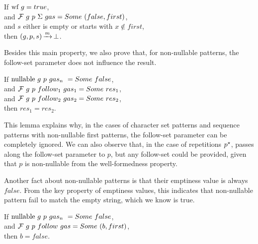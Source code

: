 \begin{lemma}
If $\text{wf}\ g = true$, \\
and $\mathcal{F}{}\ g\ p\ \Sigma\ gas = Some\ (false, first)$, \\
and $s$ either is empty or starts with $x \notin first$, \\
then $(g,p,s) \operatorname{\xrightarrow{\mathit{m}}} \operatorname{\bot}$.
\end{lemma}

Besides this main property,
we also prove that, for non-nullable patterns,
the follow-set parameter does not influence the result.

\begin{lemma}
If $\text{nullable}\ g\ p\ gas_n\ = Some\ false$, \\
and $\mathcal{F}{}\ g\ p\ follow_1\ gas_1 = Some\ res_1$, \\
and $\mathcal{F}{}\ g\ p\ follow_2\ gas_2 = Some\ res_2$, \\
then $res_1 = res_2$.
\end{lemma}

This lemma explains why, in the cases of character set patterns
and sequence patterns with non-nullable first patterns,
the follow-set parameter can be completely ignored.
We can also observe that, in the case of repetitions $p^\star$,
\lpeg{} passes along the follow-set parameter to $p$,
but any follow-set could be provided,
given that $p$ is non-nullable from the well-formedness property.

Another fact about non-nullable patterns
is that their emptiness value is always $false$.
From the key property of emptiness values,
this indicates that non-nullable pattern
fail to match the empty string,
which we know is true.

\begin{lemma}
If $\text{nullable}\ g\ p\ gas_n\ = Some\ false$, \\
and $\mathcal{F}{}\ g\ p\ follow\ gas = Some\ (b, first)$, \\
then $b = false$.
\end{lemma}




